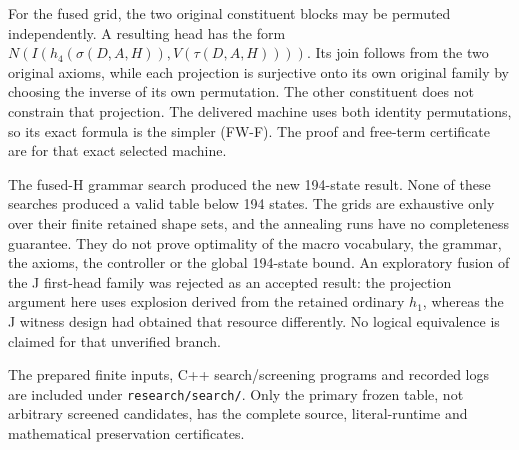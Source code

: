 For the fused grid, the two original constituent blocks may be permuted
independently.  A resulting head has the form
$N(I(h_4(\sigma(D,A,H)),V(\tau(D,A,H))))$.  Its join follows from the
two original axioms, while each projection is surjective onto its own
original family by choosing the inverse of its own permutation.  The
other constituent does not constrain that projection.  The delivered
machine uses both identity permutations, so its exact formula is the
simpler (FW-F).  The proof and free-term certificate are for that exact
selected machine.

The fused-H grammar search produced the new 194-state result.  None of
these searches produced a valid table below 194 states.  The grids are
exhaustive only over their finite retained shape sets, and the annealing
runs have no completeness guarantee.  They do not prove optimality of
the macro vocabulary, the grammar, the axioms, the controller or the
global 194-state bound.  An exploratory fusion of the J first-head
family was rejected as an accepted result: the projection argument here
uses explosion derived from the retained ordinary $h_1$, whereas the
J witness design had obtained that resource differently.  No logical
equivalence is claimed for that unverified branch.

The prepared finite inputs, C++ search/screening programs and recorded
logs are included under \texttt{research/search/}.  Only the primary
frozen table, not arbitrary screened candidates, has the complete
source, literal-runtime and mathematical preservation certificates.
